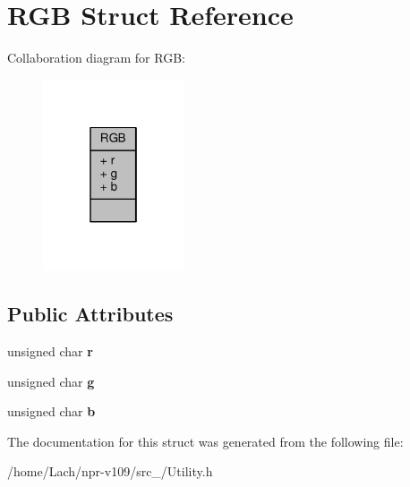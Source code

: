 \hypertarget{structRGB}{}\section{R\+GB Struct Reference}
\label{structRGB}


Collaboration diagram for R\+GB\+:
\nopagebreak
\begin{figure}[H]
\begin{center}
\leavevmode
\includegraphics[width=118pt]{structRGB__coll__graph}
\end{center}
\end{figure}
\subsection*{Public Attributes}
\begin{DoxyCompactItemize}
\item 
\hypertarget{structRGB_a8ea970fcd312802ef238733b1c9ed63d}{}\label{structRGB_a8ea970fcd312802ef238733b1c9ed63d} 
unsigned char {\bfseries r}
\item 
\hypertarget{structRGB_a3595e9a2ed44c815153aff4e84e2d97c}{}\label{structRGB_a3595e9a2ed44c815153aff4e84e2d97c} 
unsigned char {\bfseries g}
\item 
\hypertarget{structRGB_ab2a3ac761d61594e2c51d65347a74017}{}\label{structRGB_ab2a3ac761d61594e2c51d65347a74017} 
unsigned char {\bfseries b}
\end{DoxyCompactItemize}


The documentation for this struct was generated from the following file\+:\begin{DoxyCompactItemize}
\item 
/home/\+Lach/npr-\/v109/src\+\_/Utility.\+h\end{DoxyCompactItemize}
